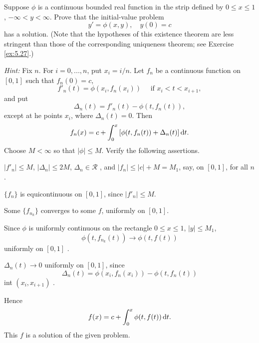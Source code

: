 \begin{myExercise}
    \label{ex:7.25}
    Suppose $\phi$ is a continuous bounded real function in the strip defined by $0 \leq x \leq 1$, $- \infty < y < \infty$. 
    Prove that the initial-value problem
    \begin{equation*}
        y' = \phi(x,y), \quad 
        y(0) = c
    \end{equation*}
    has a solution. 
    (Note that the hypotheses of this existence theorem are less stringent than those of the corresponding uniqueness theorem; see Exercise \ref{ex:5.27}.)

    \emph{Hint:} Fix $n$. For $i = 0, ... , n$, put $x_i = i/n$. Let $f_n$ be a continuous function on $[0, 1]$ such that $f_n(0) = c$,
    \begin{equation*}
        f'_n(t) = \phi(x_i, f_n(x_i)) \quad 
        \text{ if } 
        x_i < t < x_{i+1} ,
    \end{equation*}
    and put 
    \begin{equation*}
        \Delta_n(t) = f'_n(t) - \phi(t, f_n(t)),
    \end{equation*}
    except at he points $x_i$, where $\Delta_n(t) = 0$.
    Then 
    \begin{equation*}
        f_n(x) = c + \int_{0}^{x} \left[ \phi(t,f_n(t)) + \Delta_n(t) \right] \d t.
    \end{equation*}
    Choose $M < \infty$ so that $|\phi| \leq M$.
    Verify the following assertions.
    \begin{asparaenum}[(a)]
        \item $|f'_n| \leq M$, $|\Delta_n| \leq 2M$, $\Delta_n \in \mathscr{R}$ , and $|f_n| \leq |c| + M = M_1$, say, on $[0,1]$, for all $n$.
        \item $\{f_n\}$ is equicontinuous on $[0,1]$, since $|f'_n| \leq M$.
        \item Some $\{f_{n_k}\}$ converges to some $f$, uniformly on $[0,1]$.
        \item Since $\phi$ is uniformly continuous on the rectangle $0 \leq x \leq 1$, $|y| \leq M_1$,
        \begin{equation*}
            \phi(t,f_{n_k}(t)) \rightarrow
            \phi(t,f(t)) 
        \end{equation*}
        uniformly on $[0,1]$ .
        \item $\Delta_n(t) \rightarrow 0$ uniformly on $[0,1]$, since
        \begin{equation*}
            \Delta_n(t) = \phi(x_i,f_{n}(x_i)) - \phi(t,f_{n}(t))
        \end{equation*}
        int $(x_i, x_{i+1})$ .
        \item Hence 
        \begin{equation*}
            f(x) = c + \int_{0}^{x} \phi (t, f(t)) \d t .
        \end{equation*}
        This $f$ is a solution of the given problem.
    \end{asparaenum}
\end{myExercise}


